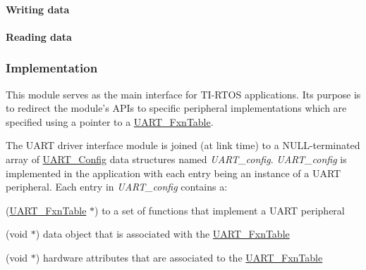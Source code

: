 \paragraph*{Writing data}




\paragraph*{Reading data}




\subsubsection*{Implementation}

This module serves as the main interface for T\-I-\/\-R\-T\-O\-S applications. Its purpose is to redirect the module's A\-P\-Is to specific peripheral implementations which are specified using a pointer to a \hyperlink{struct_u_a_r_t___fxn_table}{U\-A\-R\-T\-\_\-\-Fxn\-Table}.

The U\-A\-R\-T driver interface module is joined (at link time) to a N\-U\-L\-L-\/terminated array of \hyperlink{struct_u_a_r_t___config}{U\-A\-R\-T\-\_\-\-Config} data structures named {\itshape U\-A\-R\-T\-\_\-config}. {\itshape U\-A\-R\-T\-\_\-config} is implemented in the application with each entry being an instance of a U\-A\-R\-T peripheral. Each entry in {\itshape U\-A\-R\-T\-\_\-config} contains a\-:
\begin{DoxyItemize}
\item (\hyperlink{struct_u_a_r_t___fxn_table}{U\-A\-R\-T\-\_\-\-Fxn\-Table} $\ast$) to a set of functions that implement a U\-A\-R\-T peripheral
\item (void $\ast$) data object that is associated with the \hyperlink{struct_u_a_r_t___fxn_table}{U\-A\-R\-T\-\_\-\-Fxn\-Table}
\item (void $\ast$) hardware attributes that are associated to the \hyperlink{struct_u_a_r_t___fxn_table}{U\-A\-R\-T\-\_\-\-Fxn\-Table}
\end{DoxyItemize}

